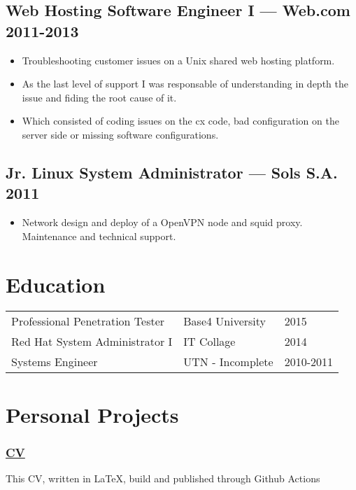\documentclass[11pt]{article}
\newcommand{\git}[2]{\href {https://github.com/azimut/#2} {#1}}
\begin{document}
\subsection{Web Hosting Software Engineer I --- Web.com \hfill 2011-2013}
\begin{itemize}
  \setlength{\parskip}{0pt}
  \setlength{\itemsep}{0pt plus 1pt}
\item Troubleshooting customer issues on a Unix shared web hosting platform.
\item As the last level of support I was responsable of understanding in depth the issue and fiding the root cause of it.
\item Which consisted of coding issues on the cx code, bad configuration on the server side or missing software configurations.
\end{itemize}

\subsection{Jr. Linux System Administrator --- Sols S.A. \hfill 2011}
\begin{itemize}
  \setlength{\parskip}{0pt}
  \setlength{\itemsep}{0pt plus 1pt}
\item Network design and deploy of a OpenVPN node and squid proxy. Maintenance and technical support.
\end{itemize}


\section{Education}


\begin{tabular}{@{}lll@{}}
  \hspace{.1em} Professional Penetration Tester & Base4 University & 2015 \\
  \hspace{.1em} Red Hat System Administrator I  & IT Collage       & 2014 \\
  \hspace{.1em} Systems Engineer                & UTN - Incomplete & 2010-2011\\
\end{tabular}


\section{Personal Projects}

\subsubsection{\git{CV}{CV}}
This CV, written in LaTeX, build and published through Github Actions
\end{document}

